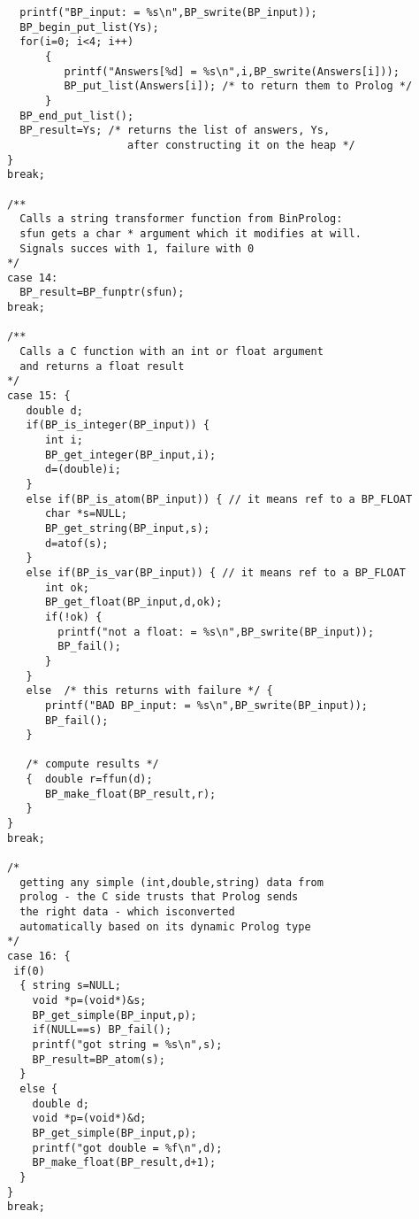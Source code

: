 \documentclass{article}
\begin{document}
{\begin{verbatim}
        printf("BP_input: = %s\n",BP_swrite(BP_input));
        BP_begin_put_list(Ys);
        for(i=0; i<4; i++)
            { 
               printf("Answers[%d] = %s\n",i,BP_swrite(Answers[i]));
               BP_put_list(Answers[i]); /* to return them to Prolog */
            }
        BP_end_put_list();       
        BP_result=Ys; /* returns the list of answers, Ys,
                         after constructing it on the heap */
      }
      break;

      /**
        Calls a string transformer function from BinProlog:
        sfun gets a char * argument which it modifies at will.
        Signals succes with 1, failure with 0
      */
      case 14:
        BP_result=BP_funptr(sfun);
      break;
      
      /**
        Calls a C function with an int or float argument
        and returns a float result
      */
      case 15: {  
         double d;
         if(BP_is_integer(BP_input)) {
            int i;
            BP_get_integer(BP_input,i);
            d=(double)i;
         }
         else if(BP_is_atom(BP_input)) { // it means ref to a BP_FLOAT
            char *s=NULL;
            BP_get_string(BP_input,s);
            d=atof(s);
         }
         else if(BP_is_var(BP_input)) { // it means ref to a BP_FLOAT
            int ok;
            BP_get_float(BP_input,d,ok);
            if(!ok) {
              printf("not a float: = %s\n",BP_swrite(BP_input));  
              BP_fail();
            }
         }
         else  /* this returns with failure */ {
            printf("BAD BP_input: = %s\n",BP_swrite(BP_input));
            BP_fail();
         }
            
         /* compute results */   
         {  double r=ffun(d);
            BP_make_float(BP_result,r);
         }
      } 
      break;

      /*
        getting any simple (int,double,string) data from
        prolog - the C side trusts that Prolog sends
        the right data - which isconverted
        automatically based on its dynamic Prolog type
      */
      case 16: {
       if(0)
        { string s=NULL;
          void *p=(void*)&s; 
          BP_get_simple(BP_input,p);
          if(NULL==s) BP_fail();
          printf("got string = %s\n",s);
          BP_result=BP_atom(s);
        }
        else { 
          double d;
          void *p=(void*)&d; 
          BP_get_simple(BP_input,p);
          printf("got double = %f\n",d);
          BP_make_float(BP_result,d+1);
        }        
      } 
      break;
      

\end{verbatim}}
\end{document}
